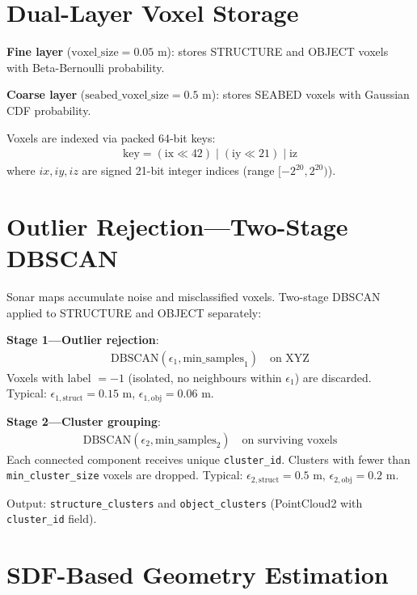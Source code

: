 \documentclass[10pt,twocolumn]{article}
\begin{document}
\section{Dual-Layer Voxel Storage}

\textbf{Fine layer} ($\text{voxel\_size} = 0.05$ m): stores STRUCTURE and OBJECT voxels with Beta-Bernoulli probability.

\textbf{Coarse layer} ($\text{seabed\_voxel\_size} = 0.5$ m): stores SEABED voxels with Gaussian CDF probability.

Voxels are indexed via packed 64-bit keys:
\begin{align}
\text{key} = (\text{ix} \ll 42) \mid (\text{iy} \ll 21) \mid \text{iz}
\end{align}
where $ix, iy, iz$ are signed 21-bit integer indices (range $[-2^{20}, 2^{20})$).

\section{Outlier Rejection---Two-Stage DBSCAN}

Sonar maps accumulate noise and misclassified voxels. Two-stage DBSCAN applied to STRUCTURE and OBJECT separately:

\textbf{Stage 1---Outlier rejection}:
\begin{align}
\text{DBSCAN}(\epsilon_1, \text{min\_samples}_1) \quad \text{on XYZ}
\end{align}
Voxels with label $= -1$ (isolated, no neighbours within $\epsilon_1$) are discarded. Typical: $\epsilon_{1,\text{struct}} = 0.15$ m, $\epsilon_{1,\text{obj}} = 0.06$ m.

\textbf{Stage 2---Cluster grouping}:
\begin{align}
\text{DBSCAN}(\epsilon_2, \text{min\_samples}_2) \quad \text{on surviving voxels}
\end{align}
Each connected component receives unique \texttt{cluster\_id}. Clusters with fewer than \texttt{min\_cluster\_size} voxels are dropped. Typical: $\epsilon_{2,\text{struct}} = 0.5$ m, $\epsilon_{2,\text{obj}} = 0.2$ m.

Output: \texttt{structure\_clusters} and \texttt{object\_clusters} (PointCloud2 with \texttt{cluster\_id} field).

\section{SDF-Based Geometry Estimation}
\end{document}
